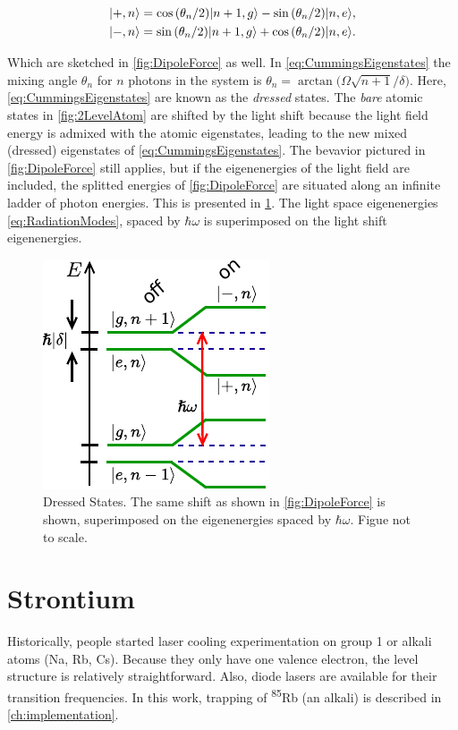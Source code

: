 \begin{subequations}\label{eq:CummingsEigenstates}
    \begin{align}
        \lvert+,n\rangle &= \cos{({\theta_n}/2)} \lvert n+1,g\rangle -\sin{(\theta_n/2)} \lvert n,e\rangle, \\
        \lvert-,n\rangle &= \sin{(\theta_n/2)}\lvert n+1,g\rangle + \cos{(\theta_n/2)} \lvert n,e\rangle.
    \end{align}
\end{subequations}

Which are sketched in \cref{fig:DipoleForce} as well. In \cref{eq:CummingsEigenstates} the mixing angle $\theta_n$ for $n$ photons in the system is $\theta_n = \arctan{(\Omega\sqrt{n+1} / \delta})$. Here, \cref{eq:CummingsEigenstates} are known as the \emph{dressed} states. The \emph{bare} atomic states in \cref{fig:2LevelAtom} are shifted by the light shift because the light field energy is admixed with the atomic eigenstates, leading to the new mixed (dressed) eigenstates of \cref{eq:CummingsEigenstates}. The bevavior pictured in \cref{fig:DipoleForce} still applies, but if the eigenenergies of the light field are included, the splitted energies of \cref{fig:DipoleForce} are situated along an infinite ladder of photon energies. This is presented in \cref{fig:DressedStatePicture}. The light space eigenenergies \cref{eq:RadiationModes}, spaced by $\hbar \omega$ is superimposed on the light shift eigenenergies. 

\begin{figure}
    \centering
    \includegraphics[width=0.3\linewidth]{figures/DressedStates.pdf}
    \caption{Dressed States. The same shift as shown in \cref{fig:DipoleForce} is shown, superimposed on the  eigenenergies spaced by $\hbar \omega$. Figue not to scale. }
    \label{fig:DressedStatePicture}
\end{figure}


\section{Strontium}\label{sec:Sr}

Historically, people started laser cooling experimentation on group 1 or alkali atoms (Na, Rb, Cs). Because they only have one valence electron, the level structure is relatively straightforward. Also, diode lasers are available for their transition frequencies. In this work, trapping of \textsuperscript{85}Rb (an alkali) is described in \cref{ch:implementation}.

